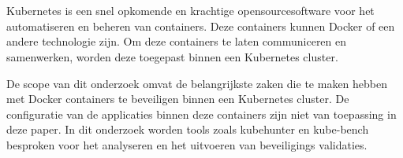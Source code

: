 
\chapter{}%
\label{ch:inleiding}

Kubernetes is een snel opkomende en krachtige opensourcesoftware voor het automatiseren en beheren van containers. Deze containers kunnen Docker of een andere technologie zijn. Om deze containers te laten communiceren en samenwerken, worden deze toegepast binnen een Kubernetes cluster. 

De scope van dit onderzoek omvat de belangrijkste zaken die te maken hebben met Docker containers te beveiligen binnen een Kubernetes cluster. De configuratie van de applicaties binnen deze containers zijn niet van toepassing in deze paper. In dit onderzoek worden tools zoals kubehunter en kube-bench besproken voor het analyseren en het uitvoeren van beveiligings validaties. 



\section{}%
\label{sec:probleemstelling}

